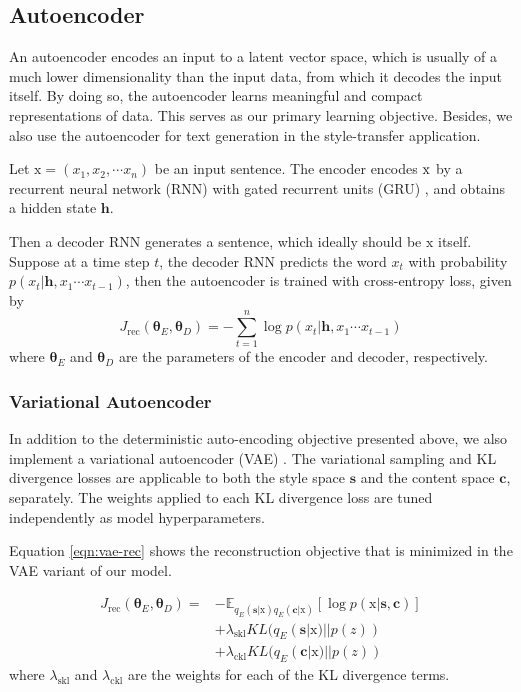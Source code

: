 \documentclass[11pt,a4paper]{article}
\newcommand{\rmx}{\mathrm x}
\newcommand{\loss}[1]{J_\text{#1}}
\begin{document}
\subsection{Autoencoder} \label{ssec:seq2seq-autoencoder}

An autoencoder encodes an input to a latent vector space, which is usually of a much lower dimensionality than the input data, from which it decodes the input itself. By doing so, the autoencoder learns meaningful and compact representations of data. This serves as our primary learning objective. Besides, we also use the autoencoder for text generation in the style-transfer application.

Let $\rmx=(x_1, x_2, \cdots x_n)$ be an input sentence. The encoder encodes $\rm x$ by a recurrent neural network (RNN) with gated recurrent units (GRU) \cite{cho2014learning}, and obtains a hidden state $\bm h$.

Then a decoder RNN generates a sentence, which ideally should be $\rmx$ itself. Suppose at a time step $t$, the decoder RNN predicts the word $x_t$ with probability $p(x_t|\bm h, x_1\cdots x_{t-1})$, then the autoencoder is trained with cross-entropy loss, given by
\begin{equation}
	\loss{rec}(\bm\theta_E,\bm\theta_D)= -\sum_{t=1}^n \log p(x_t|\bm h, x_1\cdots x_{t-1})
\end{equation}
where $\bm\theta_E$ and $\bm\theta_D$ are the parameters of the encoder and decoder, respectively.

\subsubsection{Variational Autoencoder}

In addition to the deterministic auto-encoding objective presented above, we also implement a variational autoencoder (VAE) \cite{kingma2013auto}. The variational sampling and KL divergence losses are applicable to both the style space $\bm s$ and the content space $\bm c$, separately. The weights applied to each KL divergence loss are tuned independently as model hyperparameters.

Equation \ref{eqn:vae-rec} shows the reconstruction objective that is minimized in the VAE variant of our model.

\begin{align} \label{eqn:vae-rec}
	\loss{rec}(\bm\theta_E, \bm\theta_D) = \nonumber
	 & - \mathbb{E}_{q_{E}(\bm s|\rmx) q_{E}(\bm c|\rmx)} [\log p(\rmx|\bm s, \bm c)] \nonumber \\
	 & + \lambda_{\text{skl}} KL(q_{E}(\bm s|\rmx)||p(z)) \nonumber                             \\
	 & + \lambda_{\text{ckl}} KL(q_{E}(\bm c|\rmx)||p(z))
\end{align}
where $\lambda_{\text{skl}}$ and $\lambda_{\text{ckl}}$ are the weights for each of the KL divergence terms.
\end{document}
